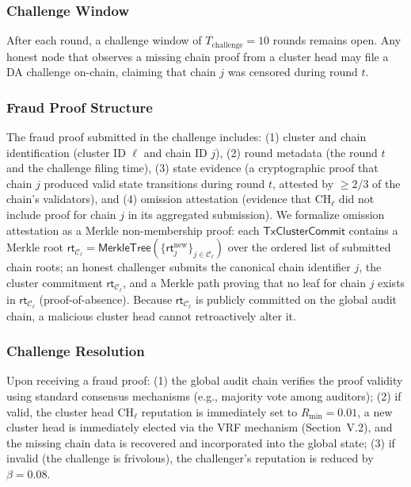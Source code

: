 \documentclass[journal]{IEEEtran}
\newcommand{\rootNew}{\mathsf{rt}_{j}^{\text{new}}}
\begin{document}
\subsubsection{Challenge Window}
After each round, a challenge window of $T_{\text{challenge}} = 10$ rounds remains open. Any honest node that observes a missing chain proof from a cluster head may file a DA challenge on-chain, claiming that chain $j$ was censored during round $t$.

\subsubsection{Fraud Proof Structure}
The fraud proof submitted in the challenge includes: (1) cluster and chain identification (cluster ID $\ell$ and chain ID $j$), (2) round metadata (the round $t$ and the challenge filing time), (3) state evidence (a cryptographic proof that chain $j$ produced valid state transitions during round $t$, attested by $\geq 2/3$ of the chain's validators), and (4) omission attestation (evidence that $\text{CH}_\ell$ did not include proof for chain $j$ in its aggregated submission). We formalize {omission attestation} as a Merkle non-membership proof: each $\mathsf{TxClusterCommit}$ contains a Merkle root $\mathsf{rt}_{\mathcal{C}_\ell} = \mathsf{MerkleTree}(\{\rootNew\}_{j\in\mathcal{C}_\ell})$ over the ordered list of submitted chain roots; an honest challenger submits the canonical chain identifier $j$, the cluster commitment $\mathsf{rt}_{\mathcal{C}_\ell}$, and a Merkle path proving that no leaf for chain $j$ exists in $\mathsf{rt}_{\mathcal{C}_\ell}$ (proof-of-absence). Because $\mathsf{rt}_{\mathcal{C}_\ell}$ is publicly committed on the global audit chain, a malicious cluster head cannot retroactively alter it.

\subsubsection{Challenge Resolution}
Upon receiving a fraud proof: (1) the global audit chain verifies the proof validity using standard consensus mechanisms (e.g., majority vote among auditors); (2) if valid, the cluster head $\text{CH}_\ell$ reputation is immediately set to $R_{\min} = 0.01$, a new cluster head is immediately elected via the VRF mechanism (Section~V.2), and the missing chain data is recovered and incorporated into the global state; (3) if invalid (the challenge is frivolous), the challenger's reputation is reduced by $\beta = 0.08$.
\end{document}
